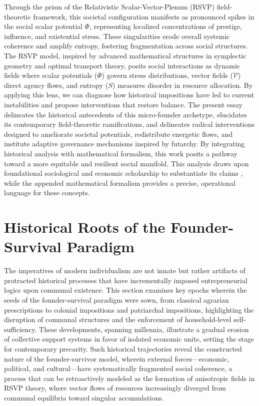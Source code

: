 \documentclass[11pt]{article}
\begin{document}
Through the prism of the Relativistic Scalar-Vector-Plenum (RSVP) field-theoretic framework, this societal configuration manifests as pronounced spikes in the social scalar potential $\Phi$, representing localized concentrations of prestige, influence, and existential stress. These singularities erode overall systemic coherence and amplify entropy, fostering fragmentation across social structures. The RSVP model, inspired by advanced mathematical structures in symplectic geometry and optimal transport theory, posits social interactions as dynamic fields where scalar potentials ($\Phi$) govern stress distributions, vector fields ($\mathcal{V}$) direct agency flows, and entropy ($S$) measures disorder in resource allocation. By applying this lens, we can diagnose how historical impositions have led to current instabilities and propose interventions that restore balance. The present essay delineates the historical antecedents of this micro-founder archetype, elucidates its contemporary field-theoretic ramifications, and delineates radical interventions designed to ameliorate societal potentials, redistribute energetic flows, and institute adaptive governance mechanisms inspired by futarchy. By integrating historical analysis with mathematical formalism, this work posits a pathway toward a more equitable and resilient social manifold. This analysis draws upon foundational sociological and economic scholarship to substantiate its claims \citep{giddens2006sociology}, while the appended mathematical formalism provides a precise, operational language for these concepts.

\section{Historical Roots of the Founder-Survival Paradigm}

The imperatives of modern individualism are not innate but rather artifacts of protracted historical processes that have incrementally imposed entrepreneurial logics upon communal existence. This section examines key epochs wherein the seeds of the founder-survival paradigm were sown, from classical agrarian prescriptions to colonial impositions and patriarchal impositions, highlighting the disruption of communal structures and the enforcement of household-level self-sufficiency. These developments, spanning millennia, illustrate a gradual erosion of collective support systems in favor of isolated economic units, setting the stage for contemporary precarity. Such historical trajectories reveal the constructed nature of the founder-survivor model, wherein external forces—economic, political, and cultural—have systematically fragmented social coherence, a process that can be retroactively modeled as the formation of anisotropic fields in RSVP theory, where vector flows of resources increasingly diverged from communal equilibria toward singular accumulations.
\end{document}
